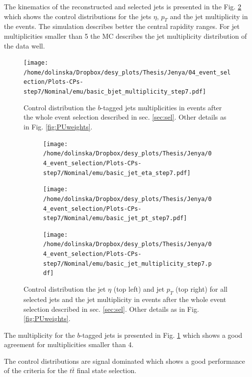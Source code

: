 The kinematics of the reconstructed and selected jets is presented in the Fig. \ref{fig:CPjetskin} which shows the control distributions for the
jets $\eta$, $p_{T}$ and the jet multiplicity in the events. The simulation describes better the central rapidity ranges. For jet multiplicities
smaller than 5 the MC describes the jet multiplicity distribution of the data well.
 
 \begin{figure}[h]
  \centering
  \texttt{[image: /home/dolinska/Dropbox/desy\_plots/Thesis/Jenya/04\_event\_selection/Plots-CPs-step7/Nominal/emu/basic\_bjet\_multiplicity\_step7.pdf]}
  \caption{Control distribution the $b$-tagged jets multiplicities in events after the whole event selection described in sec. \ref{sec:sel}. 
  Other details as in Fig. \ref{fig:PUweights}.}
  \label{fig:CPbJetMult}
 \end{figure}
 
 \begin{figure}[h]
 \centering
 \begin{subfigure}
   \centering
   \texttt{[image: /home/dolinska/Dropbox/desy\_plots/Thesis/Jenya/04\_event\_selection/Plots-CPs-step7/Nominal/emu/basic\_jet\_eta\_step7.pdf]}
 \end{subfigure}
 \begin{subfigure}
   \centering
   \texttt{[image: /home/dolinska/Dropbox/desy\_plots/Thesis/Jenya/04\_event\_selection/Plots-CPs-step7/Nominal/emu/basic\_jet\_pt\_step7.pdf]}
 \end{subfigure}
  \begin{subfigure}
   \centering
   \texttt{[image: /home/dolinska/Dropbox/desy\_plots/Thesis/Jenya/04\_event\_selection/Plots-CPs-step7/Nominal/emu/basic\_jet\_multiplicity\_step7.pdf]}
 \end{subfigure}
 \caption{Control distribution the jet $\eta$ (top left) and jet $p_{T}$ (top right) for all selected jets and the jet multiplicity in events 
  after the whole event selection described in sec. \ref{sec:sel}. 
  Other details as in Fig. \ref{fig:PUweights}.}
 \label{fig:CPjetskin}
 \end{figure}
 
The multiplicity for the $b$-tagged jets is presented in Fig. \ref{fig:CPbJetMult} which shows a good agreement for multiplicities smaller than 4.
 
The control distributions are signal dominated which shows a good performance of the criteria for the $t\bar{t}$ final state selection.



